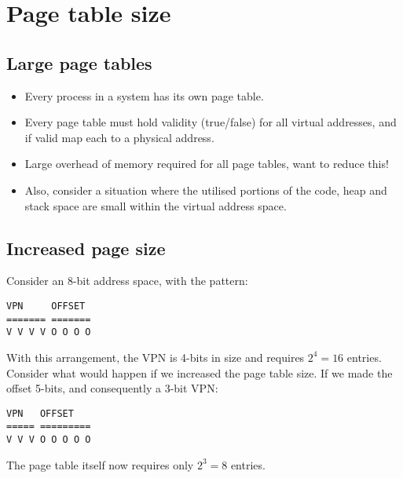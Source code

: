 \chapter{Page table size}
\label{ch:page-table-size}



\section{Large page tables}

\begin{itemize}
\item Every process in a system has its own page table.
\item Every page table must hold validity (true/false) for all virtual addresses, and if valid map each to a physical address.
\item Large overhead of memory required for all page tables, want to reduce this!
\item Also, consider a situation where the utilised portions of the code, heap and stack space are small within the virtual address space.
\end{itemize}

\section{Increased page size}

Consider an 8-bit address space, with the pattern:
\begin{verbatim}
VPN     OFFSET
======= =======
V V V V O O O O
\end{verbatim}
With this arrangement, the VPN is 4-bits in size and requires $2^4=16$ entries.
Consider what would happen if we increased the page table size.
If we made the offset 5-bits, and consequently a 3-bit VPN:
\begin{verbatim}
VPN   OFFSET
===== =========
V V V O O O O O
\end{verbatim}
The page table itself now requires only $2^3=8$ entries.

